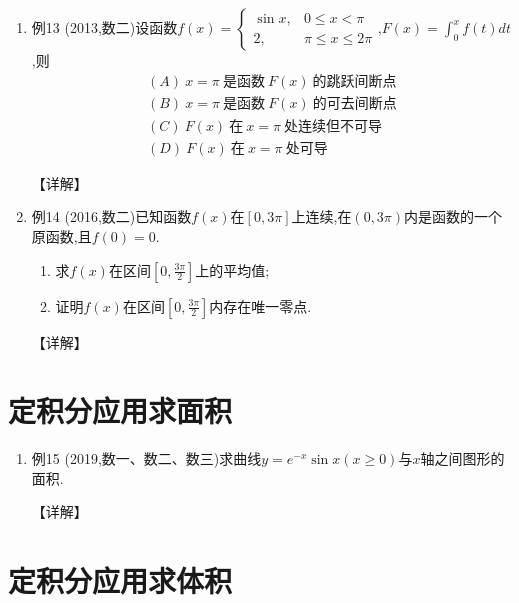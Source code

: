 \documentclass[12pt, a4paper, oneside, UTF8]{ctexbook}
\begin{document}
\begin{enumerate}[label=\arabic*.,start=12]
    \item 例13 (2013,数二)设函数$f(x)=\begin{cases}
        \sin x, & 0\leq x<\pi \\
        2, & \pi\leq x\leq 2\pi
    \end{cases}$,$F(x)=\int_0^x f(t) dt$,则
    \begin{align*}
        (A)\ x=\pi\ 是函数\ F(x)\ 的跳跃间断点 \\
        (B)\ x=\pi\ 是函数\ F(x)\ 的可去间断点 \\
        (C)\ F(x)\ 在\ x=\pi\ 处连续但不可导 \\
        (D)\ F(x)\ 在\ x=\pi\ 处可导
    \end{align*}
    
    \begin{solution}
    【详解】
    \end{solution}
    
    \item 例14 (2016,数二)已知函数$f(x)$在$[0,3\pi]$上连续,在$(0,3\pi)$内是函数的一个原函数,且$f(0)=0$.
    \begin{enumerate}[label=(\roman*)]
        \item 求$f(x)$在区间$[0,\frac{3\pi}{2}]$上的平均值;
        \item 证明$f(x)$在区间$[0,\frac{3\pi}{2}]$内存在唯一零点.
    \end{enumerate}
    
    \begin{solution}
    【详解】
    \end{solution}
\end{enumerate}

\section{ 定积分应用求面积}

\begin{enumerate}[label=\arabic*.,start=14]
    \item 例15 (2019,数一、数二、数三)求曲线$y=e^{-x}\sin x(x\geq 0)$与$x$轴之间图形的面积.
    
    \begin{solution}
    【详解】
    \end{solution}
\end{enumerate}

\section{ 定积分应用求体积}
\end{document}

